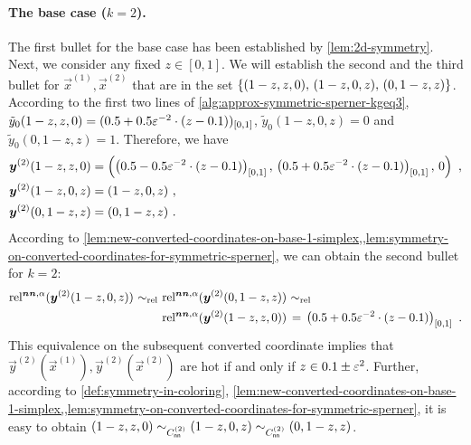\paragraph{The base case ($k=2$).}
The first bullet for the base case has been established by \cref{lem:2d-symmetry}.
Next, we consider any fixed $z\in [0,1]$.
We will establish the second and the third bullet for $\vec{x}^{(1)}, \vec{x}^{(2)}$ that are in the set $\{{(1-z,z,0),\, (1-z,0,z),\, (0,1-z,z)} \}$.
According to the first two lines of \cref{alg:approx-symmetric-sperner-kgeq3}, $\tilde{y}_0(1-z,z,0)=(0.5+0.5\varepsilon^{-2}\cdot(z-0.1))_{[0,1]}$, $\tilde{y}_0(1-z,0,z)=0$ and $\tilde{y}_0(0,1-z,z)=1$. 
Therefore, we have
\begin{align*}
    \boldsymbol{y}^{(2)}(1-z,z,0) &= \left(\left(0.5 - 0.5\varepsilon^{-2}\cdot(z-0.1)\right)_{[0,1]},\, \left(0.5 + 0.5\varepsilon^{-2}\cdot(z-0.1)\right)_{[0,1]},\, 0\right)~,
    \\
    \boldsymbol{y}^{(2)}(1-z,0,z) &= (1-z,0,z)~,\\
    \boldsymbol{y}^{(2)}(0,1-z,z) &= (0,1-z,z)~.
\end{align*}
According to \cref{lem:new-converted-coordinates-on-base-1-simplex,,lem:symmetry-on-converted-coordinates-for-symmetric-sperner}, we can obtain the second bullet for $k=2$: 
\begin{align*}
    \operatorname*{rel^{\boldsymbol{nn},\alpha}}(\boldsymbol{y}^{(2)}(1-z,0,z)) \,\operatorname*{\sim_{\rm rel}}\,
    \operatorname*{rel^{\boldsymbol{nn},\alpha}}(\boldsymbol{y}^{(2)}(0,1-z,z)) &\,\operatorname*{\sim_{\rm rel}}\,
    \\
    \operatorname*{rel^{\boldsymbol{nn},\alpha}}(\boldsymbol{y}^{(2)}(1-z,z,0)) &\,=\,
    \left(0.5 + 0.5\varepsilon^{-2}\cdot(z-0.1)\right)_{[0,1]}~.
\end{align*}
This equivalence on the subsequent converted coordinate implies that $\vec{y}^{(2)}(\vec{x}^{(1)}), \vec{y}^{(2)}(\vec{x}^{(2)})$ are hot if and only if $z\in 0.1\pm \varepsilon^2$. 
Further, according to \cref{def:symmetry-in-coloring}, \cref{lem:new-converted-coordinates-on-base-1-simplex,,lem:symmetry-on-converted-coordinates-for-symmetric-sperner}, it is easy to obtain $(1-z,z,0)\sim_{C_{\sf nn}^{(2)}} (1-z,0,z) \sim_{C_{\sf nn}^{(2)}} (0,1-z,z)$. 

